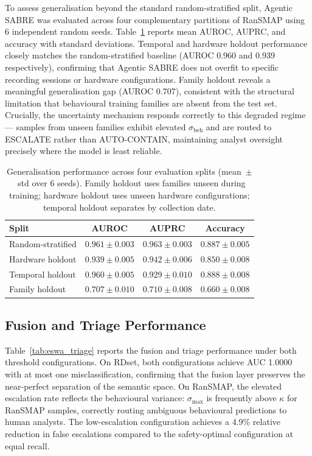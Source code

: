 To assess generalisation beyond the standard random-stratified split, Agentic SABRE was evaluated across four complementary partitions of RanSMAP using 6 independent random seeds. Table~\ref{tab:eswa_multiseed} reports mean AUROC, AUPRC, and accuracy with standard deviations. Temporal and hardware holdout performance closely matches the random-stratified baseline (AUROC 0.960 and 0.939 respectively), confirming that Agentic SABRE does not overfit to specific recording sessions or hardware configurations. Family holdout reveals a meaningful generalisation gap (AUROC 0.707), consistent with the structural limitation that behavioural training families are absent from the test set. Crucially, the uncertainty mechanism responds correctly to this degraded regime — samples from unseen families exhibit elevated $\sigma_\text{beh}$ and are routed to \textsc{ESCALATE} rather than \textsc{AUTO-CONTAIN}, maintaining analyst oversight precisely where the model is least reliable.

\begin{table}[ht]
\centering
\caption{Generalisation performance across four evaluation splits (mean~$\pm$~std over 6 seeds). Family holdout uses families unseen during training; hardware holdout uses unseen hardware configurations; temporal holdout separates by collection date.}
\label{tab:eswa_multiseed}
\begin{tabular}{lccc}
\toprule
\textbf{Split} & \textbf{AUROC} & \textbf{AUPRC} & \textbf{Accuracy} \\
\midrule
Random-stratified & $0.961 \pm 0.003$ & $0.963 \pm 0.003$ & $0.887 \pm 0.005$ \\
Hardware holdout  & $0.939 \pm 0.005$ & $0.942 \pm 0.006$ & $0.850 \pm 0.008$ \\
Temporal holdout  & $0.960 \pm 0.005$ & $0.929 \pm 0.010$ & $0.888 \pm 0.008$ \\
Family holdout    & $0.707 \pm 0.010$ & $0.710 \pm 0.008$ & $0.660 \pm 0.008$ \\
\bottomrule
\end{tabular}
\end{table}

\subsection{Fusion and Triage Performance}

Table~\ref{tab:eswa_triage} reports the fusion and triage performance under both threshold configurations. On RDset, both configurations achieve AUC 1.0000 with at most one misclassification, confirming that the fusion layer preserves the near-perfect separation of the semantic space. On RanSMAP, the elevated escalation rate reflects the behavioural variance: $\sigma_\text{max}$ is frequently above $\kappa$ for RanSMAP samples, correctly routing ambiguous behavioural predictions to human analysts. The low-escalation configuration achieves a 4.9\% relative reduction in false escalations compared to the safety-optimal configuration at equal recall.

